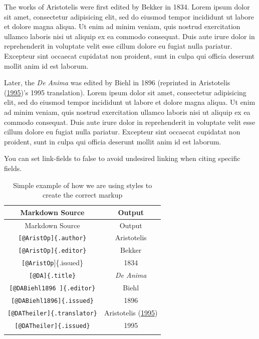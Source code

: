 \documentclass[
  12pt,
  a4paper,
  oneside,
  titlepage,
  toclink=all,
  toc=bibliography]{scrbook}
\theoremstyle{plain}
\theoremstyle{plain}
\theoremstyle{definition}
\theoremstyle{definition}
\theoremstyle{plain}
\theoremstyle{plain}
\theoremstyle{plain}
\theoremstyle{definition}
\theoremstyle{remark}
\begin{document}
\protect\hypertarget{scriv197}{}{} The works of Aristotelis were first
edited by Bekker in 1834. Lorem ipsum dolor sit amet, consectetur
adipisicing elit, sed do eiusmod tempor incididunt ut labore et dolore
magna aliqua. Ut enim ad minim veniam, quis nostrud exercitation ullamco
laboris nisi ut aliquip ex ea commodo consequat. Duis aute irure dolor
in reprehenderit in voluptate velit esse cillum dolore eu fugiat nulla
pariatur. Excepteur sint occaecat cupidatat non proident, sunt in culpa
qui officia deserunt mollit anim id est laborum.


\protect\hypertarget{scriv199}{}{} Later, the \emph{De Anima} was edited
by Biehl in 1896 (reprinted in
{\protect\hypertarget{cite_60}{}{\label{cite_60}Aristotelis
(\protect\hyperlink{ref-DATheiler}{1995})}}'s 1995 translation). Lorem
ipsum dolor sit amet, consectetur adipisicing elit, sed do eiusmod
tempor incididunt ut labore et dolore magna aliqua. Ut enim ad minim
veniam, quis nostrud exercitation ullamco laboris nisi ut aliquip ex ea
commodo consequat. Duis aute irure dolor in reprehenderit in voluptate
velit esse cillum dolore eu fugiat nulla pariatur. Excepteur sint
occaecat cupidatat non proident, sunt in culpa qui officia deserunt
mollit anim id est laborum.

You can set link-fields to false to avoid undesired linking when citing
specific fields.

\hypertarget{tbl-scriv200}{}
\begin{longtable}[]{@{}cc@{}}
\toprule\noalign{}
Markdown Source & Output \\
\midrule\noalign{}
\endfirsthead
\toprule\noalign{}
Markdown Source & Output \\
\midrule\noalign{}
\endhead
\bottomrule\noalign{}
\endlastfoot
\texttt{{[}@AristOp{]}\{.author\}} & Aristotelis \\
\texttt{{[}@AristOp{]}\{.editor\}} & Bekker \\
\texttt{{[}@AristOp}{]}\{.issued\} & 1834 \\
\texttt{{[}@DA{]}\{.title\}} & \emph{De Anima} \\
\texttt{{[}@DABiehl1896\ {]}\{.editor\}} & Biehl \\
\texttt{{[}@DABiehl1896{]}\{.issued\}} & 1896 \\
\texttt{{[}@DATheiler{]}\{.translator\}} &
{\protect\hypertarget{cite_61}{}{\label{cite_61}Aristotelis
(\protect\hyperlink{ref-DATheiler}{1995})}} \\
\texttt{{[}@DATheiler{]}\{.issued\}} & 1995 \\
\caption{\label{tbl-scriv200}Simple example of how we are using styles
to create the correct markup}\tabularnewline
\end{longtable}
\end{document}
